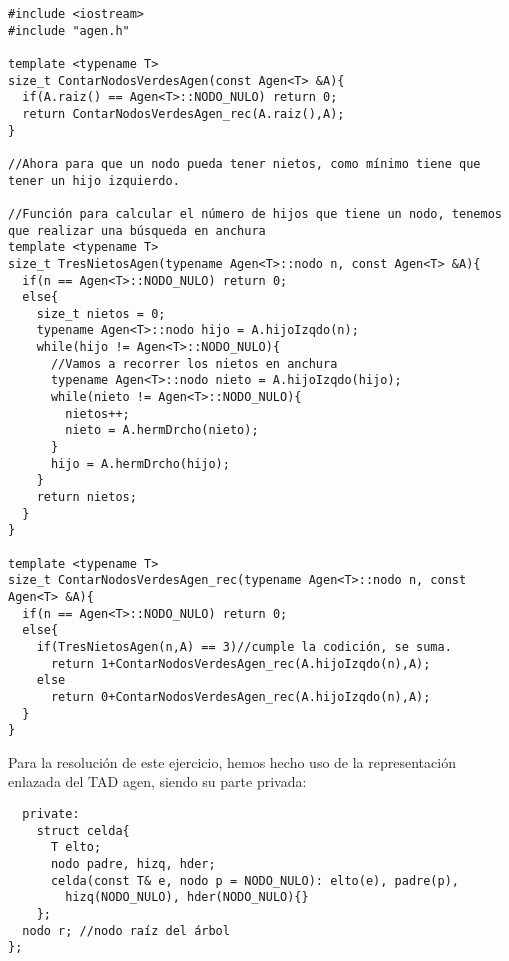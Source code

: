 \begin{verbatim}
#include <iostream>
#include "agen.h"

template <typename T>
size_t ContarNodosVerdesAgen(const Agen<T> &A){
  if(A.raiz() == Agen<T>::NODO_NULO) return 0;
  return ContarNodosVerdesAgen_rec(A.raiz(),A);
}

//Ahora para que un nodo pueda tener nietos, como mínimo tiene que tener un hijo izquierdo.

//Función para calcular el número de hijos que tiene un nodo, tenemos que realizar una búsqueda en anchura
template <typename T>
size_t TresNietosAgen(typename Agen<T>::nodo n, const Agen<T> &A){
  if(n == Agen<T>::NODO_NULO) return 0;
  else{
    size_t nietos = 0;
    typename Agen<T>::nodo hijo = A.hijoIzqdo(n);
    while(hijo != Agen<T>::NODO_NULO){
      //Vamos a recorrer los nietos en anchura
      typename Agen<T>::nodo nieto = A.hijoIzqdo(hijo);
      while(nieto != Agen<T>::NODO_NULO){
        nietos++;
        nieto = A.hermDrcho(nieto);
      }
      hijo = A.hermDrcho(hijo);
    }
    return nietos;
  }
}

template <typename T>
size_t ContarNodosVerdesAgen_rec(typename Agen<T>::nodo n, const Agen<T> &A){
  if(n == Agen<T>::NODO_NULO) return 0;
  else{
    if(TresNietosAgen(n,A) == 3)//cumple la codición, se suma.
      return 1+ContarNodosVerdesAgen_rec(A.hijoIzqdo(n),A);
    else
      return 0+ContarNodosVerdesAgen_rec(A.hijoIzqdo(n),A);
  }
}
\end{verbatim}

Para la resolución de este ejercicio, hemos hecho uso de la representación enlazada del TAD agen, siendo su parte privada:
\begin{verbatim}
  private:
    struct celda{
      T elto;
      nodo padre, hizq, hder;
      celda(const T& e, nodo p = NODO_NULO): elto(e), padre(p),
        hizq(NODO_NULO), hder(NODO_NULO){}
    };
  nodo r; //nodo raíz del árbol
};
\end{verbatim}

